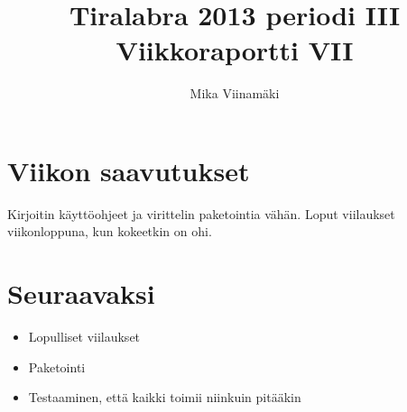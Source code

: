 \documentclass{article}
\begin{document}
\title{Tiralabra 2013 periodi III \\ Viikkoraportti VII}
\author{Mika Viinamäki}
\maketitle

\section{Viikon saavutukset}

Kirjoitin käyttöohjeet ja virittelin paketointia vähän. Loput viilaukset viikonloppuna, kun kokeetkin on ohi.

\section{Seuraavaksi}

\begin{itemize}
    \item Lopulliset viilaukset
    \item Paketointi
    \item Testaaminen, että kaikki toimii niinkuin pitääkin
\end{itemize}
\end{document}
